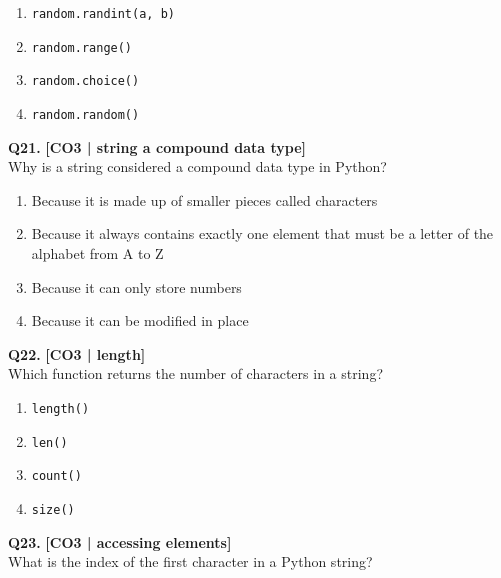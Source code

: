 \begin{enumerate}[label=(\alph*),topsep=2pt,itemsep=1pt,partopsep=0pt,parsep=0pt]
    \item \relax \texttt{random.randint(a, b)}
    \item \relax \texttt{random.range()}
    \item \relax \texttt{random.choice()}
    \item \relax \texttt{random.random()}
\end{enumerate}
\vspace{{2mm}}

\noindent\textbf{Q21.} \hfill {\small\color{LPUOrange}\textbf{[CO3 | string a compound data type]}}\\[2pt]
Why is a string considered a compound data type in Python?

\begin{enumerate}[label=(\alph*),topsep=2pt,itemsep=1pt,partopsep=0pt,parsep=0pt]
    \item \relax Because it is made up of smaller pieces called characters
    \item \relax Because it always contains exactly one element that must be a letter of the alphabet from A to Z
    \item \relax Because it can only store numbers
    \item \relax Because it can be modified in place
\end{enumerate}
\vspace{{2mm}}

\noindent\textbf{Q22.} \hfill {\small\color{LPUOrange}\textbf{[CO3 | length]}}\\[2pt]
Which function returns the number of characters in a string?

\begin{enumerate}[label=(\alph*),topsep=2pt,itemsep=1pt,partopsep=0pt,parsep=0pt]
    \item \relax \texttt{length()}
    \item \relax \texttt{len()}
    \item \relax \texttt{count()}
    \item \relax \texttt{size()}
\end{enumerate}
\vspace{{2mm}}

\noindent\textbf{Q23.} \hfill {\small\color{LPUOrange}\textbf{[CO3 | accessing elements]}}\\[2pt]
What is the index of the first character in a Python string?

